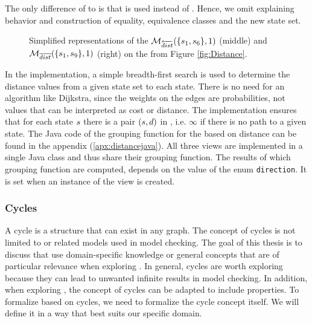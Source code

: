 \documentclass[preview]{standalone}
\begin{document}
The only difference of \viewdistancebi to \viewdistance is that \distpathbi is used instead of \distpath. Hence, we omit explaining behavior and construction of equality, equivalence classes and the new state set.

\begin{figure}[!htb]
	\begin{minipage}{.5\textwidth}
		\hspace{15mm}		
		\centering 
	\end{minipage}%
	\begin{minipage}{.5\textwidth}
		\hspace{10mm}		
		\centering 
	\end{minipage}	
	\caption{Simplified representations of the \viewsN $\viewdistancerev(\{\state_1, \state_6\}, 1)$ (middle) and ${{{{{\mathcal{M}}}}_{{{\overline{dist}}}}}}(\{{s}_1, {s}_9\}, 1)$ (right) on the \chgph from Figure \ref{fig:Distance}.} 
	\label{fig:DistanceRevBi} 
\end{figure}

In the implementation, a simple breadth-first search is used to determine the distance values from a given state set to each state. There is no need for an algorithm like Dijkstra, since the weights on the edges are probabilities, not values that can be interpreted as cost or distance. The implementation ensures that for each state ${s}$ there is a pair $({s}, {d})$ in \fctdistdefault, i.e. $\infty$ if there is no path to a given state. The Java code of the grouping function for the \viewsN based on distance can be found in the appendix (\ref{apx:distancejava}). All three views are implemented in a single Java class and thus share their grouping function. The results of which grouping function are computed, depends on the value of the enum \texttt{direction}. It is set when an instance of the view is created.

\subsubsection{Cycles}
A cycle is a structure that can exist in any graph. The concept of cycles is not limited to \chgphsN or related models used in model checking. The goal of this thesis is to discuss \viewsN that use domain-specific knowledge or general concepts that are of particular relevance when exploring \achgphN. In general, cycles are worth exploring because they can lead to unwanted infinite results in model checking. In addition, when exploring \viewsN, the concept of cycles can be adapted to include \mdpsN properties. To formalize \viewsN based on cycles, we need to formalize the cycle concept itself. We will define it in a way that best suits our specific domain.
\end{document}
